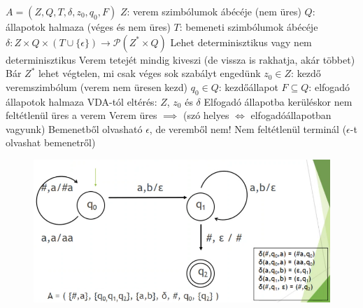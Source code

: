 \documentclass[12pt,a4paper]{article}
\begin{document}
\begin{outline}
	\1 $A = (Z,Q,T,\delta,z_0,q_0,F)$
		\2 $Z$: verem szimbólumok ábécéje (nem üres)
		\2 $Q$: állapotok halmaza (véges és nem üres)
		\2 $T$: bemeneti szimbólumok ábécéje
		\2 $\delta: Z \times Q \times (T \cup \{\epsilon\}) \to \mathcal{P}(Z^* \times Q)$
			\3 Lehet determinisztikus vagy nem determinisztikus
			\3 Verem tetejét mindig kiveszi (de vissza is rakhatja, akár többet)
			\3 Bár $Z^*$ lehet végtelen, mi csak véges sok szabályt engedünk
		\2 $z_0 \in Z$: kezdő veremszimbólum (verem nem üresen kezd)
		\2 $q_0 \in Q$: kezdőállapot
		\2 $F \subseteq Q$: elfogadó állapotok halmaza
	\1 VDA-tól eltérés: $Z$, $z_0$ és $\delta$
	\1 Elfogadó állapotba kerüléskor nem feltétlenül üres a verem
	\1 Verem üres $\implies$ (szó helyes $\Leftrightarrow$ elfogadóállapotban vagyunk)
		\2 Bemenetből olvasható $\epsilon$, de veremből nem!
	\1 Nem feltétlenül terminál ($\epsilon$-t olvashat bemenetről)
\end{outline}

\begin{figure}[h!]
	\centering
	\includegraphics[width=0.7\linewidth]{veremautomata-példa}
\end{figure}
\end{document}
